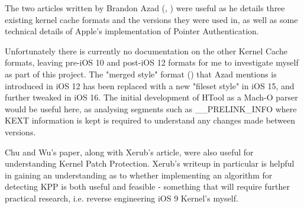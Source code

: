 
The two articles written by Brandon Azad (\cite{azad-tagged-pointers}, \cite{azad-pac-indepth}) were useful as he details three existing kernel cache formats and the versions they were used in, as well as some technical details of Apple's implementation of Pointer Authentication.

Unfortunately there is currently no documentation on the other Kernel Cache formats, leaving pre-iOS 10 and post-iOS 12 formats for me to investigate myself as part of this project. The "merged style" format (\cite{azad-tagged-pointers}) that Azad mentions is introduced in iOS 12 has been replaced with a new "fileset style" in iOS 15, and further tweaked in iOS 16. The initial development of HTool as a Mach-O parser would be useful here, as analysing segments such as \_\_PRELINK\_INFO where KEXT information is kept is required to understand any changes made between versions.

Chu and Wu's paper, along with Xerub's article, were also useful for understanding Kernel Patch Protection. Xerub's writeup in particular is helpful in gaining an understanding as to whether implementing an algorithm for detecting KPP is both useful and feasible - something that will require further practical research, i.e. reverse engineering iOS 9 Kernel's myself. 




 
 
 
 
 
 
 
 
 
 
 
 
 
 
 
 
